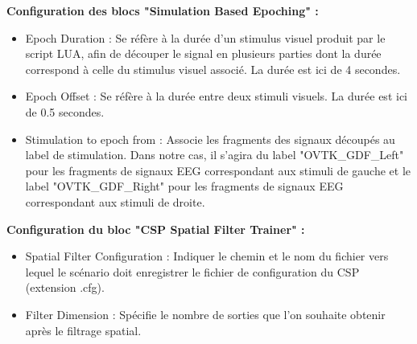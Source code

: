 \smallbreak
\textbf{Configuration des blocs "Simulation Based Epoching" : }
\smallbreak
\begin{itemize}
	\item Epoch Duration : Se réfère à la durée d'un stimulus visuel produit par le script LUA, afin de découper le signal en plusieurs parties dont la durée correspond à celle du stimulus visuel associé. La durée est ici de 4 secondes.
	\smallbreak
	\item Epoch Offset : Se réfère à la durée entre deux stimuli visuels. La durée est ici de 0.5 secondes.
	\smallbreak
	\item Stimulation to epoch from : Associe les fragments des signaux découpés au label de stimulation. Dans notre cas, il s'agira du label "OVTK\_GDF\_Left" pour les fragments de signaux EEG correspondant aux stimuli de gauche et le label "OVTK\_GDF\_Right" pour les fragments de signaux EEG correspondant aux stimuli de droite.
\end{itemize}

\smallbreak
\textbf{Configuration du bloc "CSP Spatial Filter Trainer" : }
\smallbreak
\begin{itemize}
	\item Spatial Filter Configuration : Indiquer le chemin et le nom du fichier vers lequel le scénario doit enregistrer le fichier de configuration du CSP (extension .cfg). 
	\smallbreak
	\item Filter Dimension : Spécifie le nombre de sorties que l'on souhaite obtenir après le filtrage spatial.
\end{itemize}

